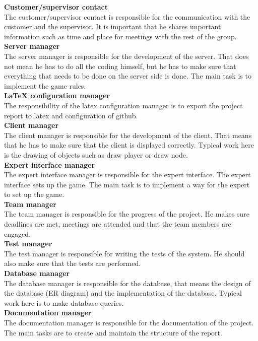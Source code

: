 \noindent\textbf{Customer/supervisor contact}\\ %
The customer/supervisor contact is responsible for the communication with the 
customer and the supervisor. It is important that he shares important 
information such as time and place for meetings with the rest of the group.
\\\newline
\textbf{Server manager}\\
The server manager is responsible for the development of the server. That does 
not mean he has to do all the coding himself, but he has to make sure that 
everything that needs to be done on the server side is done. The main task is 
to implement the game rules.
\\\newline
\textbf{LaTeX configuration manager}\\
The responsibility of the latex configuration manager is to export the project 
report to latex and configuration of github.
\\\newline
\textbf{Client manager}\\
The client manager is responsible for the development of the client. That means 
that he has to make sure that the client is displayed correctly. Typical work 
here is the drawing of objects such as draw player or draw node. 
\\\newline
\textbf{Expert interface manager}\\
The expert interface manager is responsible for the expert interface. The 
expert interface sets up the game. The main task is to implement a way for the 
expert to set up the game.
\\\newline
\textbf{Team manager}\\
The team manager is responsible for the progress of the project. He makes sure 
deadlines are met, meetings are attended and that the team members are engaged.
\\\newline
\textbf{Test manager}\\
The test manager is responsible for writing the tests of the system. He should 
also make sure that the tests are performed.
\\\newline
\textbf{Database manager}\\
The database manager is responsible for the database, that means the design of the database (ER diagram) and the implementation of the database. Typical work here is to make database queries. 
\\\newline
\textbf{Documentation manager}\\
The documentation manager is responsible for the documentation of the project. The main tasks are to create and maintain the structure of the report.




